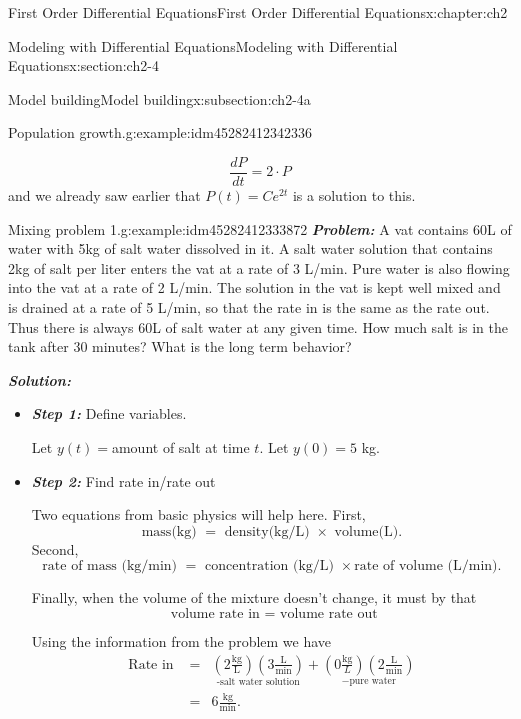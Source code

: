 \documentclass[oneside,10pt,]{book}
\newcommand{\alert}[1]{\textbf{\textit{#1}}}
\numberwithin{equation}{section}
\numberwithin{equation}{section}
\newcommand{\amp}{&}
\begin{document}
\begin{chapterptx}{First Order Differential Equations}{}{First Order Differential Equations}{}{}{x:chapter:ch2}
\begin{sectionptx}{Modeling with Differential Equations}{}{Modeling with Differential Equations}{}{}{x:section:ch2-4}
\begin{subsectionptx}{Model building}{}{Model building}{}{}{x:subsection:ch2-4a}
\begin{example}{Population growth.}{g:example:idm45282412342336}
\begin{itemize}[label=\textbullet]
\begin{equation*}
\frac{dP}{dt}=2\cdot P
\end{equation*}
and we already saw earlier that \(P(t)=Ce^{2t}\) is a solution to this.%
\end{itemize}
\end{example}
\begin{example}{Mixing problem 1.}{g:example:idm45282412333872}%
\alert{Problem:} A vat contains 60L of water with 5kg of salt water dissolved in it. A salt water solution that contains 2kg of salt per liter enters the vat at a rate of 3 L\slash{}min. Pure water is also flowing into the vat at a rate of 2 L\slash{}min. The solution in the vat is kept well mixed and is drained at a rate of 5 L\slash{}min, so that the rate in is the same as the rate out. Thus there is always 60L of salt water at any given time. How much salt is in the tank after 30 minutes? What is the long term behavior?%
\par
\alert{Solution:}%
%
\begin{itemize}[label=\textbullet]
\item{}\alert{Step 1:} Define variables.%
\par
Let \(y(t)=\)amount of salt at time \(t\). Let \(y(0)=5\) kg.%
\item{}\alert{Step 2:} Find rate in\slash{}rate out%
\par
Two equations from basic physics will help here. First,%
\begin{equation*}
\text{mass(kg) } = \text{ density(kg/L) } \times \text{ volume(L)}.
\end{equation*}
Second,%
\begin{equation*}
\text{rate of mass (kg/min) } = \text{ concentration (kg/L) } \times \text{rate of volume (L/min)}.
\end{equation*}
%
\par
Finally, when the volume of the mixture doesn't change, it must by that%
\begin{equation*}
\text{ volume rate in } = \text{ volume rate out}
\end{equation*}
%
\par
Using the information from the problem we have%
\begin{align*}
\mbox{Rate in } \amp = \amp \underset{\mbox{-salt water solution}}{\left(2\frac{\mbox{kg}}{\mbox{L}}\right)\left(3\frac{\mbox{L}}{\mbox{min}}\right)}+\underset{-\mbox{pure water}}{\left(0\frac{\mbox{kg}}{L}\right)\left(2\frac{\mbox{L}}{\mbox{min}}\right)}\\
\amp = \amp 6\frac{\mbox{kg}}{\mbox{min}}.

\end{align*}
\end{itemize}
\end{example}
\end{subsectionptx}
\end{sectionptx}
\end{chapterptx}
\end{document}
